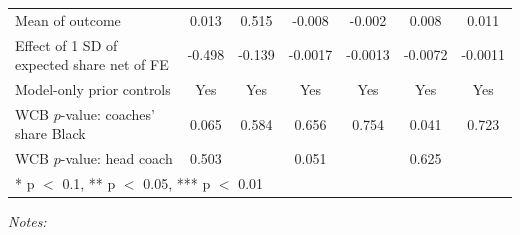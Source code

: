 \begin{table}[!h]
{\begin{threeparttable}
\begin{tabular}[t]{lcccccc}
Mean of outcome & 0.013 & 0.515 & -0.008 & -0.002 & 0.008 & 0.011\\
Effect of 1 SD of expected share net of FE & -0.498 & -0.139 & -0.0017 & -0.0013 & -0.0072 & -0.0011\\
Model-only prior controls & Yes & Yes & Yes & Yes & Yes & Yes\\
WCB $p$-value: coaches' share Black & 0.065 & 0.584 & 0.656 & 0.754 & 0.041 & 0.723\\
WCB $p$-value: head coach & 0.503 &  & 0.051 &  & 0.625 & \\
\bottomrule
\multicolumn{7}{l}{\rule{0pt}{1em}* p $<$ 0.1, ** p $<$ 0.05, *** p $<$ 0.01}\\
\end{tabular}
\begin{tablenotes}[para]
\item \textit{Notes:} 

\end{tablenotes}
\end{threeparttable}}
\end{table}
